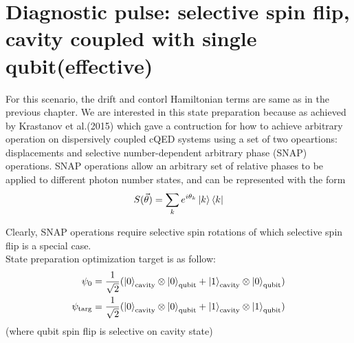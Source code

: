 \documentclass[12pt]{report}
\begin{document}
\section{Diagnostic pulse: selective spin flip, cavity coupled with single qubit(effective)}

For this scenario, the drift and contorl Hamiltonian terms are same as in the previous chapter. We are interested in this state 
preparation because as achieved by Krastanov et al.(2015) \cite{Krastanov2015} which gave a contruction for how to achieve arbitrary 
operation on dispersively coupled cQED systems using a set of two opeartions: displacements and selective number-dependent arbitrary phase (SNAP) operations. 
SNAP operations allow an arbitrary set of relative phases to be applied to different photon number states, and can be represented with the form
\begin{equation}
    S(\vec{\theta}) = \sum_k e^{i\theta_k} \ket{k}\bra{k}
\end{equation}

Clearly, SNAP operations require selective spin rotations of which selective spin flip is a special case.
\\
State preparation optimization target is as follow: 
\begin{align*}
    \psi_0 &= \frac{1}{\sqrt{2}} (\ket{0}_{\text{cavity}} \otimes \ket{0}_{\text{qubit}} 
                + \ket{1}_{\text{cavity}} \otimes \ket{0}_{\text{qubit}})\\
    \psi_{\text{targ}} &= \frac{1}{\sqrt{2}} (\ket{0}_{\text{cavity}} \otimes \ket{0}_{\text{qubit}} 
                + \ket{1}_{\text{cavity}} \otimes \ket{1}_{\text{qubit}})\\
\end{align*}
(where qubit spin flip is selective on cavity state)

\\
\end{document}
